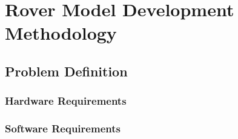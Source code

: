\chapter{Rover Model Development Methodology}

\section{Problem Definition}
  \subsection{Hardware Requirements}
  \subsection{Software Requirements}